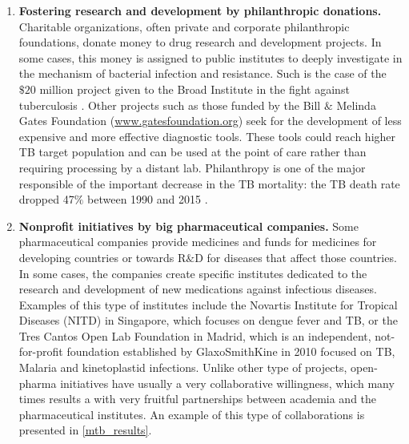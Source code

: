 \documentclass[11pt, b5paper,twoside]{tesi_upf}
\begin{document}
\begin{enumerate}

\item \textbf{Fostering research and development by philanthropic donations.} Charitable organizations, often private and corporate philanthropic foundations, donate money to drug research and development projects. In some cases, this money is assigned to public institutes to deeply investigate in the mechanism of bacterial infection and resistance. Such is the case of the $\$20$ million  project given to the Broad Institute in the fight against tuberculosis \cite{BroadInstitute}. Other projects such as those funded by the Bill $\&$ Melinda Gates Foundation (\url{www.gatesfoundation.org}) seek for the development of less expensive and more effective diagnostic tools. These tools could reach higher TB target population and can be used at the point of care rather than requiring processing by a distant lab. Philanthropy is one of the major responsible of the important decrease in the TB mortality: the TB death rate dropped 47$\%$ between 1990 and 2015 \cite{Lewandowski2015}. 

\item \textbf{Nonprofit initiatives by big pharmaceutical companies.} Some pharmaceutical companies provide medicines and funds for medicines for developing countries or towards R$\&$D for diseases that affect those countries. In some cases, the companies create specific institutes dedicated to the research and development of new medications against infectious diseases. Examples of this type of institutes include the Novartis Institute for Tropical Diseases (NITD) in Singapore, which focuses on dengue fever and TB, or the Tres Cantos Open Lab Foundation in Madrid, which is an independent, not-for-profit foundation established by GlaxoSmithKine in 2010 focused on TB, Malaria and kinetoplastid infections. Unlike other type of projects, open-pharma initiatives have usually a very collaborative willingness, which many times results a with very fruitful partnerships between academia and the pharmaceutical institutes. An example of this type of collaborations is presented in \cref{mtb_results}.


\end{enumerate}
\end{document}
